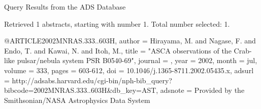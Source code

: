 Query Results from the ADS Database


Retrieved 1 abstracts, starting with number 1.  Total number selected: 1.

@ARTICLE{2002MNRAS.333..603H,
   author = {{Hirayama}, M. and {Nagase}, F. and {Endo}, T. and {Kawai}, N. and 
	{Itoh}, M.},
    title = "{ASCA observations of the Crab-like pulsar/nebula system PSR B0540-69}",
  journal = {\mnras},
     year = 2002,
    month = jul,
   volume = 333,
    pages = {603-612},
      doi = {10.1046/j.1365-8711.2002.05435.x},
   adsurl = {http://adsabs.harvard.edu/cgi-bin/nph-bib_query?bibcode=2002MNRAS.333..603H&db_key=AST},
  adsnote = {Provided by the Smithsonian/NASA Astrophysics Data System}
}


